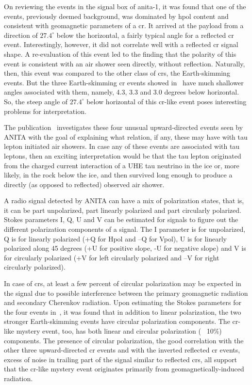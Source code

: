 On reviewing the events in the signal box of \gls{anita}-1, it was found that one of the events, previously deemed background, was dominated by \gls{hpol} content and consistent with geomagnetic parameters of a \gls{cr}. It arrived at the payload from a direction of $27.4^{\circ}$ below the horizontal, a fairly typical angle for a reflected \gls{cr} event. Interestingly, however, it did not correlate well with a reflected \gls{cr} signal shape. A re-evaluation of this event led to the finding that the polarity of this event is consistent with an air shower seen directly, without reflection. Naturally, then, this event was compared to the other class of \gls{cr}s, the Earth-skimming events. But the three Earth-skimming \gls{cr} events showed in~\cite{me1} have much shallower angles associated with them, namely, 4.3, 3.3 and 3.0 degrees below horizontal. So, the steep angle of $27.4^{\circ}$ below horizontal of this \gls{cr}-like event poses interesting problems for interpretation. 

The publication~\cite{me1} investigates these four unusual upward-directed events seen by ANITA with the goal of explaining what relation, if any, these may have with tau lepton initiated air showers. In case any of these events are associated with tau leptons, then an exciting interpretation would be that the tau lepton originated from the charged current interaction of a UHE tau neutrino in the ice or, more likely, in the rock below the ice, and then survived long enough to produce a directly (as opposed to reflected) observed air shower.

A radio signal detected by ANITA can have a mix of polarization states, that is, it can be part unpolarized, part linearly polarized and part circularly polarized. Stokes parameters I, Q, U and V can be estimated for signals to figure out the different polarization components of a signal. The I parameter is for unpolarized, Q is for linearly polarized (+Q for Hpol and –Q for Vpol), U is for linearly polarized along 45 degrees (+U for positive slope, -U for negative slope) and V is for circularly polarized (+V for left circularly polarized and –V for right circularly polarized).

In case of \gls{cr}s, at least a few percent of circular polarization may be expected in the signal due to possible interference between the primary geomagnetic radiation and secondary Cherenkov radiation. Upon estimating the Stokes parameters for the four events in~\cite{me1}, it was found that in addition to linear polarization, the two stronger Earth-skimming events have circular polarization components. The \gls{cr}-like mystery event, too, has both linear and circular polarization (~ 10\%) components. The presence of circular polarization, the good correlation with the other three upward-directed \gls{cr} events and with the inverted reflected \gls{cr} events, excess of noise in trailing part of the signal similar to reflected \gls{cr}s, all support that the \gls{cr}-like mystery event originates primarily from geomagnetically-induced radiation. 

